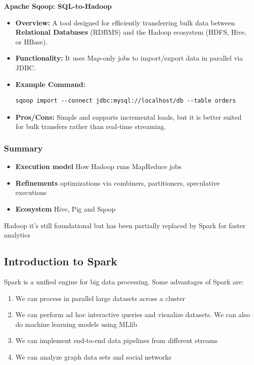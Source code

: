 \textbf{Apache Sqoop: SQL-to-Hadoop}
\begin{itemize}
    \item \textbf{Overview:} A tool designed for efficiently transferring bulk data between \textbf{Relational Databases} (RDBMS) and the Hadoop ecosystem (HDFS, Hive, or HBase).
    \item \textbf{Functionality:} It uses Map-only jobs to import/export data in parallel via JDBC.
    
    
    
    \item \textbf{Example Command:}
\begin{verbatim}
sqoop import --connect jdbc:mysql://localhost/db --table orders
\end{verbatim}
    \item \textbf{Pros/Cons:} Simple and supports incremental loads, but it is better suited for bulk transfers rather than real-time streaming.
\end{itemize}


\subsubsection{Summary}

\begin{itemize}
    \item \textbf{Execution model} \ra How Hadoop runs MapReduce jobs
    \item \textbf{Refinements} \ra optimizations via combiners, partitioners, speculative executions
    \item \textbf{Ecosystem} \ra Hive, Pig and Sqoop
\end{itemize}

Hadoop it's still foundational but has been partially replaced by Spark for faster analytics












\subsection{Introduction to Spark}

Spark is a unified engine for big data processing. Some advantages of Spark are:
\begin{enumerate}
    \item We can process in parallel large datasets across a cluster
    \item We can perform ad hoc interactive queries and visualize datasets. We can also do machine learning models using MLlib
    \item We can implement end-to-end data pipelines from different streams
    \item We can analyze graph data sets and social networks
\end{enumerate}

